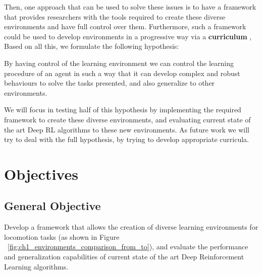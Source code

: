 Then, one approach that can be used to solve these issues is to have a framework
that provides researchers with the tools required to create these diverse environments
and have full control over them. Furthermore, such a framework could be used to develop
environments in a progressive way via a \textbf{curriculum} \citep{CurriculumLearningBengio},
Based on all this, we formulate the following hypothesis:

\begin{hypothesis}
    By having control of the learning environment we can control the learning procedure
    of an agent in such a way that it can develop complex and robust behaviours to solve
    the tasks presented, and also generalize to other environments.
\end{hypothesis}

We will focus in testing half of this hypothesis by implementing the required framework
to create these diverse environments, and evaluating current state of the art Deep RL algorithms
to these new environments. As future work we will try to deal with the full hypothesis, by
trying to develop appropriate curricula.

\figEnvManipSimToreal

\figEnvironmentsProposalFromTo

\section{Objectives}
\label{sec:objectives}

\subsection*{General Objective}
Develop a framework that allows the creation of diverse learning environments for locomotion tasks (as shown in Figure ~\ref{fig:ch1_environments_comparison_from_to}), 
and evaluate the performance and generalization capabilities of current state of the art Deep 
Reinforcement Learning algorithms.

